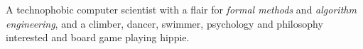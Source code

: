 







\begin{fullwidth}
  A technophobic computer scientist with a flair for \emph{formal methods} and \emph{algorithm
    engineering}, and a climber, dancer, swimmer, psychology and philosophy interested and board
  game playing hippie.
\end{fullwidth}





\divider



\divider



\newpage


